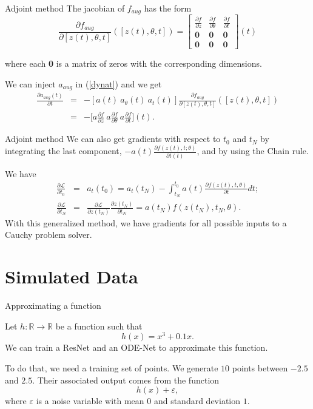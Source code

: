 \documentclass[11pt]{beamer}
\begin{document}
\begin{frame}{Adjoint method}
The jacobian of $f_{aug}$ has the form
\begin{equation*}
\frac{\partial f_{aug}}{\partial [z(t),\theta,t]}([z(t),\theta,t]) = \begin{bmatrix}
\frac{\partial f}{\partial z} & \frac{\partial f}{\partial \theta} & \frac{\partial f}{\partial t} \\
\textbf{0} & \textbf{0} & \textbf{0} \\
\textbf{0} & \textbf{0} & \textbf{0}
\end{bmatrix}(t)
\end{equation*}

where each \textbf{0} is a matrix of zeros with the corresponding dimensions.

We can inject $a_{aug}$ in (\ref{dynat}) and we get
\begin{eqnarray*}
\frac{\partial a_{aug}(t)}{\partial t} 
&=& - [a(t) \ a_\theta (t) \ a_t (t)]\frac{\partial f_{aug}}{\partial [ z(t),\theta , t]}([z(t),\theta , t]) \\
&=& -\Big[a\frac{\partial f}{\partial z} \ a\frac{\partial f}{\partial \theta} \ a\frac{\partial  f}{\partial t}\Big] (t).
\end{eqnarray*}
\end{frame}

\begin{frame}{Adjoint method}
We can also get gradients with respect to $t_0$ and $t_N$ by integrating the last component, $-a(t)\frac{\partial f(z(t),t;\theta)}{\partial t(t)}$, and by using the Chain rule. 

We have
\begin{eqnarray*}
\frac{\partial \mathcal{L}}{\partial t_0} &=& a_t(t_0) = a_t(t_N) - \int_{t_N}^{t_0} a(t) \frac{\partial f(z(t),t,\theta)}{\partial t} dt ; \\
\frac{\partial \mathcal{L}}{\partial t_N} &=& \frac{\partial \mathcal{L}}{\partial z(t_N)} \frac{\partial z(t_N)}{\partial t_N} = a(t_N)f(z(t_N),t_N,\theta).
\end{eqnarray*}
With this generalized method, we have gradients for all possible inputs to a Cauchy problem solver. 
\end{frame}

\section{Simulated Data}

\begin{frame}{Approximating a function}

Let $h:\mathbb{R} \to \mathbb{R}$ be a function such that
$$
h(x) = x^3 + 0.1x.
$$
We can train a ResNet and an ODE-Net to approximate this function.

To do that, we need a training set of points. We generate $10$ points between $-2.5$ and $2.5$. Their associated output comes from the function
$$
h(x) + \varepsilon,
$$
where $\varepsilon$ is a noise variable with mean $0$ and standard deviation $1$.
\end{frame}
\end{document}
